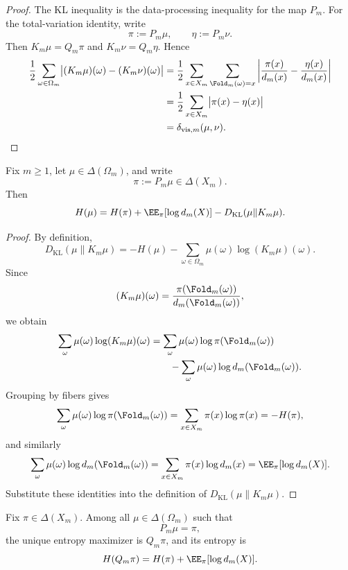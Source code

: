 \begin{proof}
The KL inequality is the data-processing inequality for the map \(P_m\).  For
the total-variation identity, write
\[
  \pi:=P_m\mu,
  \qquad
  \eta:=P_m\nu.
\]
Then \(K_m\mu=Q_m\pi\) and \(K_m\nu=Q_m\eta\).  Hence
\begin{align*}
  \frac12\sum_{\omega\in\Omega_m}
  \bigl|(K_m\mu)(\omega)-(K_m\nu)(\omega)\bigr|
  &=
  \frac12\sum_{x\in X_m}
  \sum_{\Fold_m(\omega)=x}
  \left|\frac{\pi(x)}{d_m(x)}-\frac{\eta(x)}{d_m(x)}\right| \\
  &=
  \frac12\sum_{x\in X_m}\bigl|\pi(x)-\eta(x)\bigr| \\
  &=
  \delta_{\mathrm{vis},m}(\mu,\nu).
\end{align*}
\end{proof}

\begin{theorem}
\label{thm:entropy-identity}
Fix \(m\ge 1\), let \(\mu\in\Delta(\Omega_m)\), and write
\[
  \pi:=P_m\mu\in\Delta(X_m).
\]
Then
\[
  H(\mu)
  =
  H(\pi)+\EE_\pi[\log d_m(X)]-D_{\mathrm{KL}}(\mu\|K_m\mu).
\]
\end{theorem}

\begin{proof}
By definition,
\[
  D_{\mathrm{KL}}(\mu\|K_m\mu)
  =
  -H(\mu)-\sum_{\omega\in\Omega_m}\mu(\omega)\log (K_m\mu)(\omega).
\]
Since
\[
  (K_m\mu)(\omega)=\frac{\pi(\Fold_m(\omega))}{d_m(\Fold_m(\omega))},
\]
we obtain
\begin{align*}
  \sum_{\omega}\mu(\omega)\log (K_m\mu)(\omega)
  &=
  \sum_{\omega}\mu(\omega)\log\pi(\Fold_m(\omega)) \\
  &\qquad
  -\sum_{\omega}\mu(\omega)\log d_m(\Fold_m(\omega)).
\end{align*}
Grouping by fibers gives
\[
  \sum_{\omega}\mu(\omega)\log\pi(\Fold_m(\omega))
  =
  \sum_{x\in X_m}\pi(x)\log \pi(x)
  =
  -H(\pi),
\]
and similarly
\[
  \sum_{\omega}\mu(\omega)\log d_m(\Fold_m(\omega))
  =
  \sum_{x\in X_m}\pi(x)\log d_m(x)
  =
  \EE_\pi[\log d_m(X)].
\]
Substitute these identities into the definition of
\(D_{\mathrm{KL}}(\mu\|K_m\mu)\).
\end{proof}

\begin{corollary}
\label{cor:max-entropy-visible}
Fix \(\pi\in\Delta(X_m)\).  Among all \(\mu\in\Delta(\Omega_m)\) such that
\[
  P_m\mu=\pi,
\]
the unique entropy maximizer is \(Q_m\pi\), and its entropy is
\[
  H(Q_m\pi)=H(\pi)+\EE_\pi[\log d_m(X)].
\]
\end{corollary}

